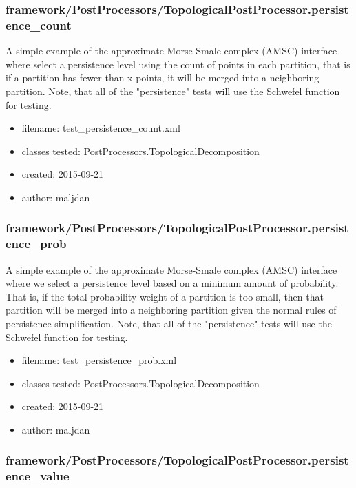     \subsubsection{framework/PostProcessors/TopologicalPostProcessor.persistence\_count}
      
       A simple example of the approximate Morse-Smale complex (AMSC) interface
       where select a persistence level using the count of points in each
       partition, that is if a partition has fewer than x points, it will be
       merged into a neighboring partition. Note, that all of the
       "persistence" tests will use the Schwefel function for testing.
    
      \begin{itemize}
          \item filename: test\_persistence\_count.xml
          \item classes tested: PostProcessors.TopologicalDecomposition
          \item created: 2015-09-21
          \item author: maljdan
      \end{itemize}
    \subsubsection{framework/PostProcessors/TopologicalPostProcessor.persistence\_prob}
      
       A simple example of the approximate Morse-Smale complex (AMSC) interface
       where we select a persistence level based on a minimum amount of
       probability. That is, if the total probability weight of a partition is
       too small, then that partition will be merged into a neighboring
       partition given the normal rules of persistence simplification. Note,
       that all of the "persistence" tests will use the Schwefel function for
       testing.
    
      \begin{itemize}
          \item filename: test\_persistence\_prob.xml
          \item classes tested: PostProcessors.TopologicalDecomposition
          \item created: 2015-09-21
          \item author: maljdan
      \end{itemize}
    \subsubsection{framework/PostProcessors/TopologicalPostProcessor.persistence\_value}
      
